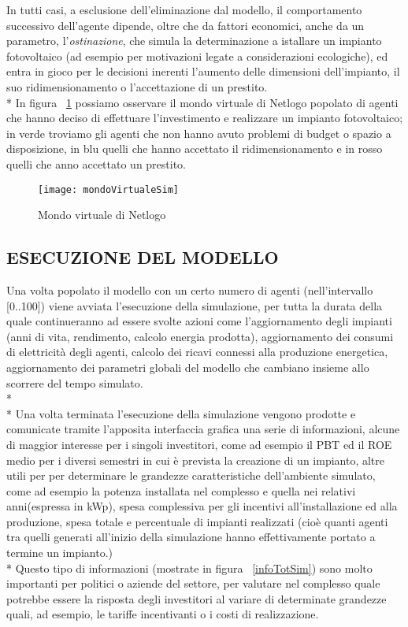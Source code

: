\documentclass[12pt,a4paper,openright,twoside]{report}
\begin{document}
In tutti casi, a esclusione dell'eliminazione dal modello, il comportamento successivo dell'agente dipende, oltre che da fattori economici, anche da un parametro, l'\emph{ostinazione}, che simula la determinazione a istallare un impianto fotovoltaico (ad esempio per motivazioni legate a considerazioni ecologiche), ed entra in gioco per le decisioni inerenti l'aumento delle dimensioni dell'impianto, il suo ridimensionamento o l'accettazione di un prestito.\\*
In figura ~\ref{mondoVirtualeSim} possiamo osservare il mondo virtuale di Netlogo popolato di agenti che hanno deciso di effettuare l'investimento e realizzare un impianto fotovoltaico; in verde troviamo gli agenti che non hanno avuto problemi di budget o spazio a disposizione, in blu quelli che hanno accettato il ridimensionamento e in rosso quelli che anno accettato un prestito.

\begin{figure}[hbt]
	\centering
	\texttt{[image: mondoVirtualeSim]}
	\caption{Mondo virtuale di Netlogo}
	\label{mondoVirtualeSim}
\end{figure}

\subsection{ESECUZIONE DEL MODELLO}

Una volta popolato il modello con un certo numero di agenti (nell'intervallo [0..100]) viene avviata l'esecuzione della simulazione, per tutta la durata della quale continueranno ad essere svolte azioni come l'aggiornamento degli impianti (anni di vita, rendimento, calcolo energia prodotta), aggiornamento dei consumi di elettricità degli agenti, calcolo dei ricavi connessi alla produzione energetica, aggiornamento dei parametri globali del modello che cambiano insieme allo scorrere del tempo simulato. 
\\* \\*
Una volta terminata l'esecuzione della simulazione vengono prodotte e comunicate tramite l'apposita interfaccia grafica una serie di informazioni, alcune di maggior interesse per i singoli investitori, come ad esempio il PBT ed il ROE medio per i diversi semestri in cui è prevista la creazione di un impianto, altre utili per  per determinare le grandezze caratteristiche dell'ambiente simulato, come ad esempio la potenza installata nel complesso e quella nei relativi anni(espressa in kWp), spesa complessiva per gli incentivi all'installazione ed alla produzione, spesa totale e percentuale di impianti realizzati (cioè quanti agenti tra quelli generati all'inizio della simulazione hanno effettivamente portato a termine un impianto.)
\\*
Questo tipo di informazioni (mostrate in figura ~\ref{infoTotSim}) sono molto importanti per politici o aziende del settore, per valutare nel complesso quale potrebbe essere la risposta degli investitori al variare di determinate grandezze quali, ad esempio, le tariffe incentivanti o i costi di realizzazione. 
\end{document}
